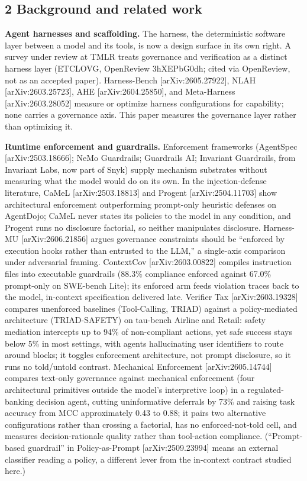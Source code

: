 \documentclass[
]{article}
\newcounter{none} %
\begin{document}
\subsection{2 Background and related
work}\label{background-and-related-work}

\textbf{Agent harnesses and scaffolding.} The harness, the deterministic
software layer between a model and its tools, is now a design surface in
its own right. A survey under review at TMLR treats governance and
verification as a distinct harness layer (ETCLOVG, OpenReview
3hXEPbG0dh; cited via OpenReview, not as an accepted paper).
Harness-Bench {[}arXiv:2605.27922{]}, NLAH {[}arXiv:2603.25723{]}, AHE
{[}arXiv:2604.25850{]}, and Meta-Harness {[}arXiv:2603.28052{]} measure
or optimize harness configurations for capability; none carries a
governance axis. This paper measures the governance layer rather than
optimizing it.

\textbf{Runtime enforcement and guardrails.} Enforcement frameworks
(AgentSpec {[}arXiv:2503.18666{]}; NeMo Guardrails; Guardrails AI;
Invariant Guardrails, from Invariant Labs, now part of Snyk) supply
mechanism substrates without measuring what the model would do on its
own. In the injection-defense literature, CaMeL {[}arXiv:2503.18813{]}
and Progent {[}arXiv:2504.11703{]} show architectural enforcement
outperforming prompt-only heuristic defenses on AgentDojo; CaMeL never
states its policies to the model in any condition, and Progent runs no
disclosure factorial, so neither manipulates disclosure. Harness-MU
{[}arXiv:2606.21856{]} argues governance constraints should be
``enforced by execution hooks rather than entrusted to the LLM,'' a
single-axis comparison under adversarial framing. ContextCov
{[}arXiv:2603.00822{]} compiles instruction files into executable
guardrails (88.3\% compliance enforced against 67.0\% prompt-only on
SWE-bench Lite); its enforced arm feeds violation traces back to the
model, in-context specification delivered late. Verifier Tax
{[}arXiv:2603.19328{]} compares unenforced baselines (Tool-Calling,
TRIAD) against a policy-mediated architecture (TRIAD-SAFETY) on
tau-bench Airline and Retail: safety mediation intercepts up to 94\% of
non-compliant actions, yet safe success stays below 5\% in most
settings, with agents hallucinating user identifiers to route around
blocks; it toggles enforcement architecture, not prompt disclosure, so
it runs no told/untold contrast. Mechanical Enforcement
{[}arXiv:2605.14744{]} compares text-only governance against mechanical
enforcement (four architectural primitives outside the model's
interpretive loop) in a regulated-banking decision agent, cutting
uninformative deferrals by 73\% and raising task accuracy from MCC
approximately 0.43 to 0.88; it pairs two alternative configurations
rather than crossing a factorial, has no enforced-not-told cell, and
measures decision-rationale quality rather than tool-action compliance.
(``Prompt-based guardrail'' in Policy-as-Prompt {[}arXiv:2509.23994{]}
means an external classifier reading a policy, a different lever from
the in-context contract studied here.)
\end{document}
